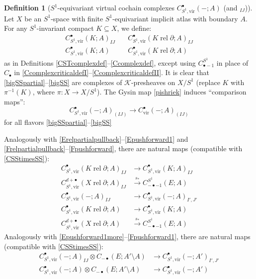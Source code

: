 \documentclass[12pt]{article}
\theoremstyle{definition}
\newtheorem{definition}[theorem]{Definition}
\theoremstyle{remark}
\numberwithin{equation}{subsection}
\newcommand{\K}{\mathcal K}
\newcommand{\vir}{\mathrm{vir}}
\newcommand{\rel}{\operatorname{rel}}
\begin{document}
\begin{definition}[$S^1$-equivariant virtual cochain complexes $C_{S^1,\vir}^\bullet(-;A)$ (and $_{IJ}$)]
Let $X$ be an $S^1$-space with finite $S^1$-equivariant implicit atlas with boundary $A$.  For any $S^1$-invariant compact $K\subseteq X$, we define:
\begin{align}
\label{bigSSpartial}C^\bullet_{S^1,\vir}(K;A)_{IJ}\quad&C^\bullet_{S^1,\vir}(K\rel\partial;A)_{IJ}\\
\label{bigSS}C^\bullet_{S^1,\vir}(K;A)\phantom{_{IJ}}\quad&C^\bullet_{S^1,\vir}(K\rel\partial;A)
\end{align}
as in Definitions \ref{CSTcomplexdef}--\ref{Ccomplexdef}, except using $C_{\bullet-1}^{S^1}$ in place of $C_\bullet$ in \eqref{CcomplexcriticaldefI}--\eqref{CcomplexcriticaldefII}.  It is clear that \eqref{bigSSpartial}--\eqref{bigSS} are complexes of $\K$-presheaves on $X/S^1$ (replace $K$ with $\pi^{-1}(K)$, where $\pi:X\to X/S^1$).  The Gysin map \eqref{pishriek} induces ``comparison maps'':
\begin{equation}\label{CSStimesSS}
C^\bullet_{S^1,\vir}(-;A)_{(IJ)}\to C^\bullet_\vir(-;A)_{(IJ)}
\end{equation}
for all flavors \eqref{bigSSpartial}--\eqref{bigSS}

Analogously with \eqref{Erelpartialpullback}--\eqref{Epushforward1} and \eqref{Frelpartialpullback}--\eqref{Fpushforward}, there are natural maps (compatible with \eqref{CSStimesSS}):
\begin{align}
C^\bullet_{S^1,\vir}(K\rel\partial;A)_{IJ}&\to C^\bullet_{S^1,\vir}(K;A)_{IJ}\\
C^{d+\bullet}_{S^1,\vir}(X\rel\partial;A)_{IJ}&\xrightarrow{s_\ast}C_{-\bullet-1}^{S^1}(E;A)\\
C^\bullet_{S^1,\vir}(-;A)_{IJ}&\to C^\bullet_{S^1,\vir}(-;A)_{I',J'}\\
\label{CSSrelpartialpullback}C^\bullet_{S^1,\vir}(K\rel\partial;A)&\to C^\bullet_{S^1,\vir}(K;A)\\
\label{CSSpushforward}C^{d+\bullet}_{S^1,\vir}(X\rel\partial;A)&\xrightarrow{s_\ast}C_{-\bullet-1}^{S^1}(E;A)
\end{align}
Analogously with \eqref{Epushforward1more}--\eqref{Fpushforward1}, there are natural maps (compatible with \eqref{CSStimesSS}):
\begin{align}
C^\bullet_{S^1,\vir}(-;A)_{IJ}\otimes C_{-\bullet}(E;A'\setminus A)&\to C^\bullet_{S^1,\vir}(-;A')_{I',J'}\\
C^\bullet_{S^1,\vir}(-;A)\otimes C_{-\bullet}(E;A'\setminus A)&\to C^\bullet_{S^1,\vir}(-;A')
\end{align}
\end{definition}
\end{document}
